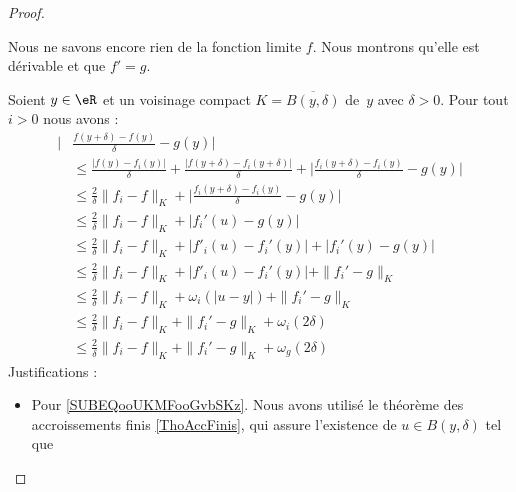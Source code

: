\begin{proof}
\begin{subproof}
		Nous ne savons encore rien de la fonction limite \( f\). Nous montrons qu'elle est dérivable et que \( f'=g\).

		Soient \( y\in \eR\) et un voisinage compact \( K=\overline{ B(y,\delta) }\) de~\( y\) avec \( \delta>0\). Pour tout \( i>0\) nous avons :
		\begin{subequations}
			\begin{align}
				\Big| & \frac{ f(y+\delta)-f(y) }{ \delta }  - g(y) \Big|                                                                                                   \\
				      & \leq   \frac{ | f(y)-f_i(y)|}{ \delta }  +\frac{ | f(y+\delta)-f_i(y+\delta) | }{ \delta }+\big| \frac{ f_i(y+\delta)-f_i(y) }{ \delta }-g(y) \big| \\
				      & \leq \frac{ 2 }{ \delta } \|f_i - f\|_K + \big| \frac{ f_i(y+\delta)-f_i(y) }{ \delta }-g(y) \big|                                                  \\
				      & \leq \frac{ 2 }{ \delta }\| f_i-f \|_K+| f_i'(u)-g(y) |  \label{SUBEQooUKMFooGvbSKz}                                                                \\
				      & \leq \frac{ 2 }{ \delta }\| f_i-f \|_K+| f'_i(u)-f_i'(y) |+| f_i'(y)-g(y) |                                                                         \\
				      & \leq \frac{ 2 }{ \delta }\| f_i-f \|_K+| f'_i(u)-f_i'(y) |+\| f_i'-g \|_K  \label{SUBEQooWHLZooCGTjeH}                                              \\
				      & \leq \frac{ 2 }{ \delta }\| f_i-f \|_K+   \omega_i(| u-y |)    +\| f_i'-g \|_K                                                                      \\
				      & \leq \frac{ 2 }{ \delta }\| f_i-f \|_K      +\| f_i'-g \|_K + \omega_i(2\delta)    \label{SUBEQooVRWIooCwEWPE}                                      \\
				      & \leq \frac{ 2 }{ \delta }\| f_i-f \|_K      +\| f_i'-g \|_K + \omega_g(2\delta)    \label{SUBEQooQNMMooRsAjyb}
			\end{align}
		\end{subequations}
		Justifications :
		\begin{itemize}
			\item
			      Pour \ref{SUBEQooUKMFooGvbSKz}. Nous avons utilisé le théorème des accroissements finis \ref{ThoAccFinis}, qui assure l'existence de \( u\in B(y,\delta) \) tel que

\end{itemize}
\end{subproof}
\end{proof}
